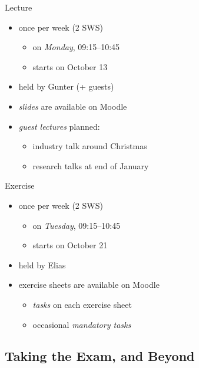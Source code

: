 \begin{frame}{\myframetitle}
	\begin{fancycolumns}
		\begin{definition}{Lecture}
			\begin{itemize}
				\item once per week (2 SWS)
				\begin{itemize}
					\item on \emph{Monday}, 09:15--10:45
					\item starts on October 13
				\end{itemize}
				\item held by Gunter (+ guests)
				\item \emph{slides} are available on Moodle
				\item \emph{guest lectures} planned:
				\begin{itemize}
					\item industry talk around Christmas
					\item research talks at end of January
				\end{itemize}
			\end{itemize}
		\end{definition}
	\nextcolumn
		\begin{example}{Exercise}
			\begin{itemize}
				\item once per week (2 SWS)
				\begin{itemize}
					\item on \emph{Tuesday}, 09:15--10:45
					\item starts on October 21
				\end{itemize}
				\item held by Elias
				\item exercise sheets are available on Moodle
				\begin{itemize}
					\item \emph{tasks} on each exercise sheet
					\item occasional \emph{mandatory tasks}
				\end{itemize}
			\end{itemize}
		\end{example}
	\end{fancycolumns}
\end{frame}

\subsection{Taking the Exam, and Beyond}

